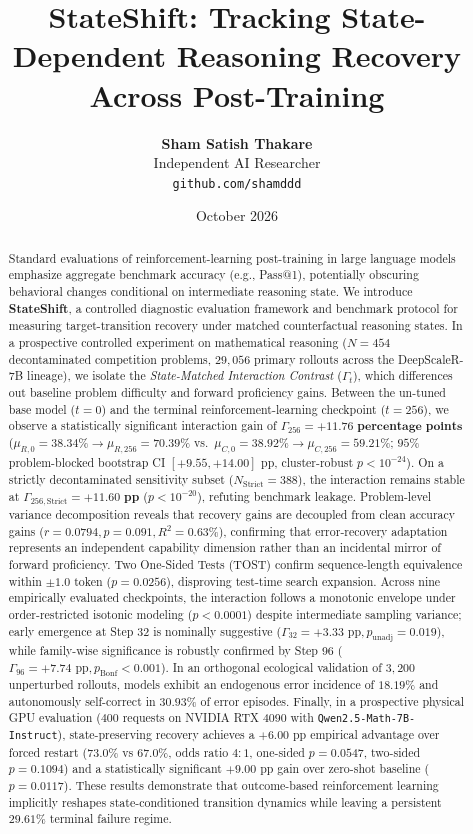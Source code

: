 \documentclass[11pt]{article}
\title{\textbf{StateShift: Tracking State-Dependent Reasoning Recovery\\Across Post-Training}}
\author{
  \textbf{Sham Satish Thakare} \\
  Independent AI Researcher \\
  \texttt{github.com/shamddd} \\
}
\date{October 2026}
\begin{document}
\maketitle

\begin{abstract}
Standard evaluations of reinforcement-learning post-training in large language models emphasize aggregate benchmark accuracy (e.g., Pass@1), potentially obscuring behavioral changes conditional on intermediate reasoning state. We introduce \textbf{StateShift}, a controlled diagnostic evaluation framework and benchmark protocol for measuring target-transition recovery under matched counterfactual reasoning states. In a prospective controlled experiment on mathematical reasoning ($N=454$ decontaminated competition problems, $29,056$ primary rollouts across the DeepScaleR-7B lineage), we isolate the \emph{State-Matched Interaction Contrast} ($\Gamma_t$), which differences out baseline problem difficulty and forward proficiency gains. Between the un-tuned base model ($t=0$) and the terminal reinforcement-learning checkpoint ($t=256$), we observe a statistically significant interaction gain of $\Gamma_{256} = \mathbf{+11.76\text{ percentage points}}$ ($\mu_{R,0}=38.34\% \to \mu_{R,256}=70.39\%$ vs.\ $\mu_{C,0}=38.92\% \to \mu_{C,256}=59.21\%$; $95\%$ problem-blocked bootstrap CI $[+9.55, +14.00]\text{ pp}$, cluster-robust $p < 10^{-24}$). On a strictly decontaminated sensitivity subset ($N_{\text{Strict}}=388$), the interaction remains stable at $\Gamma_{256,\text{Strict}} = \mathbf{+11.60\text{ pp}}$ ($p < 10^{-20}$), refuting benchmark leakage. Problem-level variance decomposition reveals that recovery gains are decoupled from clean accuracy gains ($r = 0.0794, p = 0.091, R^2 = 0.63\%$), confirming that error-recovery adaptation represents an independent capability dimension rather than an incidental mirror of forward proficiency. Two One-Sided Tests (TOST) confirm sequence-length equivalence within $\pm 1.0$ token ($p = 0.0256$), disproving test-time search expansion. Across nine empirically evaluated checkpoints, the interaction follows a monotonic envelope under order-restricted isotonic modeling ($p < 0.0001$) despite intermediate sampling variance; early emergence at Step 32 is nominally suggestive ($\Gamma_{32} = +3.33\text{ pp}, p_{\text{unadj}} = 0.019$), while family-wise significance is robustly confirmed by Step 96 ($\Gamma_{96} = +7.74\text{ pp}, p_{\text{Bonf}} < 0.001$). In an orthogonal ecological validation of $3,200$ unperturbed rollouts, models exhibit an endogenous error incidence of $18.19\%$ and autonomously self-correct in $30.93\%$ of error episodes. Finally, in a prospective physical GPU evaluation ($400$ requests on NVIDIA RTX 4090 with \texttt{Qwen2.5-Math-7B-Instruct}), state-preserving recovery achieves a $+6.00\text{ pp}$ empirical advantage over forced restart ($73.0\%$ vs $67.0\%$, odds ratio $4:1$, one-sided $p = 0.0547$, two-sided $p = 0.1094$) and a statistically significant $+9.00\text{ pp}$ gain over zero-shot baseline ($p = 0.0117$). These results demonstrate that outcome-based reinforcement learning implicitly reshapes state-conditioned transition dynamics while leaving a persistent $29.61\%$ terminal failure regime.
\end{abstract}
\end{document}
